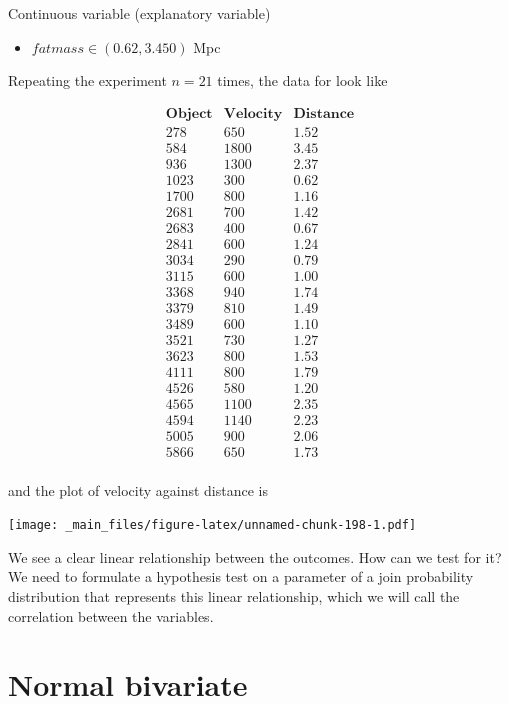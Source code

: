 \documentclass[
]{book}
\providecommand{\tightlist}{%
  \setlength{\itemsep}{0pt}\setlength{\parskip}{0pt}}
\begin{document}
Continuous variable (explanatory variable)

\begin{itemize}
\tightlist
\item
  \(fatmass \in (0.62, 3.450)\) Mpc
\end{itemize}

Repeating the experiment \(n=21\) times, the data for look like

\[
  \begin{array}{ccc}
  \mathbf{Object} & \mathbf{Velocity} & \mathbf{Distance} \\ 
  278 & 650 & 1.52 \\
  584 & 1800 & 3.45 \\
  936 & 1300 & 2.37 \\
  1023 & 300 & 0.62 \\
  1700 & 800 & 1.16 \\
  2681 & 700 & 1.42 \\
  2683 & 400 & 0.67 \\
  2841 & 600 & 1.24 \\
  3034 & 290 & 0.79 \\
  3115 & 600 & 1.00 \\
  3368 & 940 & 1.74 \\
  3379 & 810 & 1.49 \\
  3489 & 600 & 1.10 \\
  3521 & 730 & 1.27 \\
  3623 & 800 & 1.53 \\
  4111 & 800 & 1.79 \\
  4526 & 580 & 1.20 \\
  4565 & 1100 & 2.35 \\
  4594 & 1140 & 2.23 \\
  5005 & 900 & 2.06 \\
  5866 & 650 & 1.73 \\
  \end{array}
\]

and the plot of velocity against distance is

\texttt{[image: \_main\_files/figure-latex/unnamed-chunk-198-1.pdf]}

We see a clear linear relationship between the outcomes. How can we test for it? We need to formulate a hypothesis test on a parameter of a join probability distribution that represents this linear relationship, which we will call the correlation between the variables.

\hypertarget{normal-bivariate}{%
\section{Normal bivariate}\label{normal-bivariate}}
\end{document}
